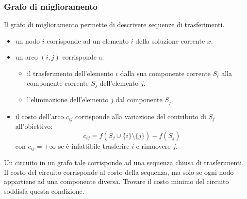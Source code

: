 \documentclass{article}
\begin{document}
\subsubsection{Grafo di miglioramento}
Il grafo di miglioramento permette di descrivere sequenze di trasferimenti.
\begin{itemize}
    \item un nodo $i$ corrisponde ad un elemento $i$ della soluzione corrente $x$.
    \item un arco $(i,j)$ corrisponde a:
    \begin{itemize}
        \item il trasferimento dell'elemento $i$ dalla sua componente corrente $S_i$
        alla componente corrente $S_j$ dell'elemento $j$.
        \item l'eliminazione dell'elemento $j$ dal componente $S_j$.
    \end{itemize}
    \item il costo dell'arco $c_{ij}$ corrisponde alla variazione del contributo di $S_j$
    all'obiettivo:
    $$c_{ij}=f(S_j\cup\{i\}\setminus\{j\})-f(S_j)$$
    con $c_{ij}=+\infty$ se è infattibile trasferire $i$ e rimuovere $j$.
\end{itemize}
Un circuito in un grafo tale corrisponde ad una sequenza chiusa di trasferimenti. Il
costo del circuito corrisponde al costo della sequenza, ma solo se ogni nodo appartiene
ad una componente diversa. Trovare il costo minimo del circuito soddisfa questa condizione.
\end{document}
